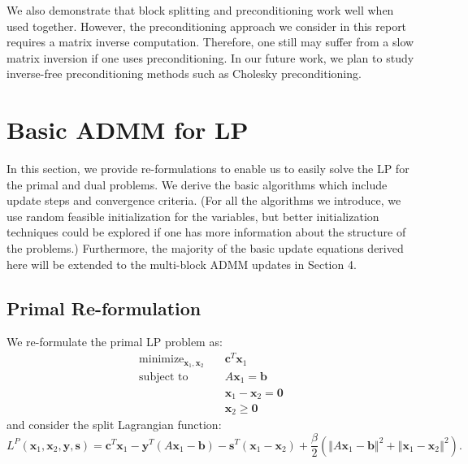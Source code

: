 \documentclass{article}
\begin{document}
We also demonstrate that block splitting and preconditioning work well when used together. However, the preconditioning approach we consider in this report requires a matrix inverse computation. Therefore, one still may suffer from a slow matrix inversion if one uses preconditioning. In our future work, we plan to study inverse-free preconditioning methods such as Cholesky preconditioning.

\vspace{0.2in}
\section{Basic ADMM for LP}
In this section, we provide re-formulations to enable us to easily solve the LP for the primal and dual problems. We derive the basic algorithms which include update steps and convergence criteria. (For all the algorithms we introduce, we use random feasible initialization for the variables, but better initialization techniques could be explored if one has more information about the structure of the problems.) Furthermore, the majority of the basic update equations derived here will be extended to the multi-block ADMM updates in Section 4.
\vspace{0.1in}
\subsection*{Primal Re-formulation}
We re-formulate the primal LP problem as:
\begin{align}
\text{minimize}_{ \mathbf{x}_{1}, \mathbf{x}_{2}} &\quad \mathbf{c}^T\mathbf{x}_1 \tag{OPT3}\label{OPT3} \\
\text{subject to  \ \  } &\quad  A \mathbf{x}_{1} = \mathbf{b}  \nonumber \\
&\quad \mathbf{x}_{1}  - \mathbf{x}_{2} = \mathbf{0}  \nonumber \\
&\quad \mathbf{x}_{2} \geq \mathbf{0} \nonumber 
\end{align}
and consider the split Lagrangian function:
\[
L^{P}(\mathbf{x}_{1},\mathbf{x}_{2},\mathbf{y} ,\mathbf{s})=\mathbf{c}^{T}\mathbf{x}_{1}-\mathbf{y}^{T}\left(A\mathbf{x}_{1}-\mathbf{b}\right)-\mathbf{s}^{T}\left(\mathbf{x}_{1}-\mathbf{x}_{2}\right)+\frac{\beta}{2}\left(\left\Vert A\mathbf{x}_{1}-\mathbf{b}\right\Vert ^{2}+\left\Vert \mathbf{x}_{1}-\mathbf{x}_{2}\right\Vert ^{2}\right).
\]
\end{document}
